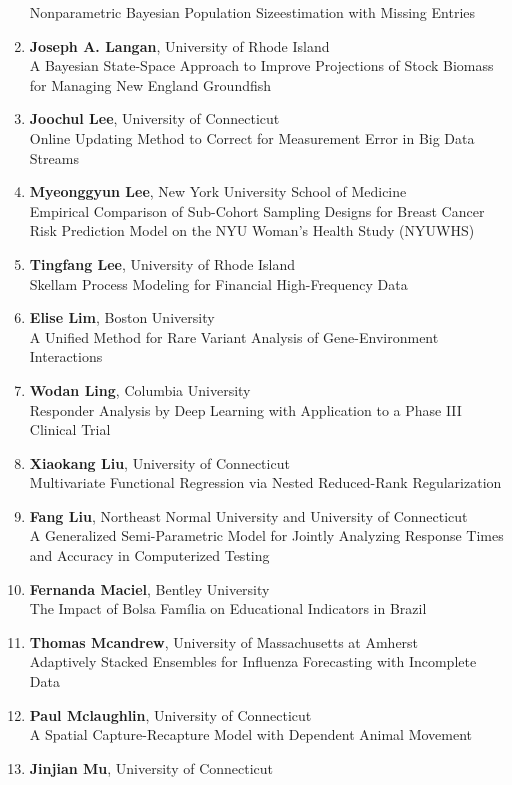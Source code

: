 \begin{enumerate}
Nonparametric Bayesian Population Sizeestimation with Missing Entries
\item \textbf{Joseph A. Langan}, University of Rhode Island \\
A Bayesian State-Space Approach to Improve Projections of Stock Biomass for Managing New England Groundfish
\item \textbf{Joochul Lee}, University of Connecticut \\
Online Updating Method to Correct for Measurement Error in Big Data Streams
\item \textbf{Myeonggyun Lee}, New York University School of Medicine \\
Empirical Comparison of Sub-Cohort Sampling Designs for Breast Cancer Risk Prediction Model on the NYU Woman’s Health Study (NYUWHS)
\item \textbf{Tingfang Lee}, University of Rhode Island \\
Skellam Process Modeling for Financial High-Frequency Data
\item \textbf{Elise Lim}, Boston University \\
A Unified Method for Rare Variant Analysis of Gene-Environment Interactions
\item \textbf{Wodan Ling}, Columbia University \\
Responder Analysis by Deep Learning with Application to a Phase III Clinical Trial
\item \textbf{Xiaokang Liu}, University of Connecticut \\
Multivariate Functional Regression via Nested Reduced-Rank Regularization
\item \textbf{Fang Liu}, Northeast Normal University and University of Connecticut \\
A Generalized Semi-Parametric Model for Jointly Analyzing Response Times and Accuracy in Computerized Testing
\item \textbf{Fernanda Maciel}, Bentley University \\
The Impact of Bolsa Família on Educational Indicators in Brazil
\item \textbf{Thomas Mcandrew}, University of Massachusetts at Amherst \\
Adaptively Stacked Ensembles for Influenza Forecasting with Incomplete Data
\item \textbf{Paul Mclaughlin}, University of Connecticut \\
A Spatial Capture-Recapture Model with Dependent Animal Movement
\item \textbf{Jinjian Mu}, University of Connecticut \\

\end{enumerate}
